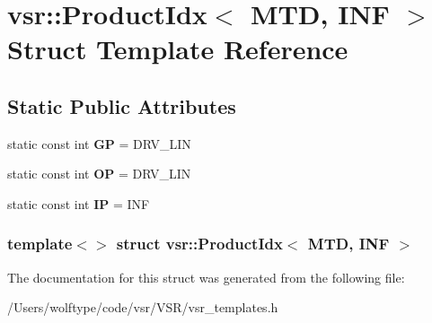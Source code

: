 \hypertarget{structvsr_1_1_product_idx_3_01_m_t_d_00_01_i_n_f_01_4}{\section{vsr\-:\-:Product\-Idx$<$ M\-T\-D, I\-N\-F $>$ Struct Template Reference}
\label{structvsr_1_1_product_idx_3_01_m_t_d_00_01_i_n_f_01_4}
}
\subsection*{Static Public Attributes}
\begin{DoxyCompactItemize}
\item 
\hypertarget{structvsr_1_1_product_idx_3_01_m_t_d_00_01_i_n_f_01_4_adff5c05e2a11e817fed52a8af27b2665}{static const int {\bfseries G\-P} = D\-R\-V\-\_\-\-L\-I\-N}\label{structvsr_1_1_product_idx_3_01_m_t_d_00_01_i_n_f_01_4_adff5c05e2a11e817fed52a8af27b2665}

\item 
\hypertarget{structvsr_1_1_product_idx_3_01_m_t_d_00_01_i_n_f_01_4_a847d6c29598cecd3fba1f4d61c112a8c}{static const int {\bfseries O\-P} = D\-R\-V\-\_\-\-L\-I\-N}\label{structvsr_1_1_product_idx_3_01_m_t_d_00_01_i_n_f_01_4_a847d6c29598cecd3fba1f4d61c112a8c}

\item 
\hypertarget{structvsr_1_1_product_idx_3_01_m_t_d_00_01_i_n_f_01_4_a203cb038305b6ec5f05394a9126bc273}{static const int {\bfseries I\-P} = I\-N\-F}\label{structvsr_1_1_product_idx_3_01_m_t_d_00_01_i_n_f_01_4_a203cb038305b6ec5f05394a9126bc273}

\end{DoxyCompactItemize}
\subsubsection*{template$<$$>$ struct vsr\-::\-Product\-Idx$<$ M\-T\-D, I\-N\-F $>$}



The documentation for this struct was generated from the following file\-:\begin{DoxyCompactItemize}
\item 
/\-Users/wolftype/code/vsr/\-V\-S\-R/vsr\-\_\-templates.\-h\end{DoxyCompactItemize}
